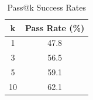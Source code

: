 \begin{table}[h]
\centering
\caption{Pass@k Success Rates}
\label{tab:pass_at_k}
\begin{tabular}{cc}
\toprule
k & Pass Rate (\%) \\
\midrule
1 & 47.8 \\
3 & 56.5 \\
5 & 59.1 \\
10 & 62.1 \\
\bottomrule
\end{tabular}
\end{table}